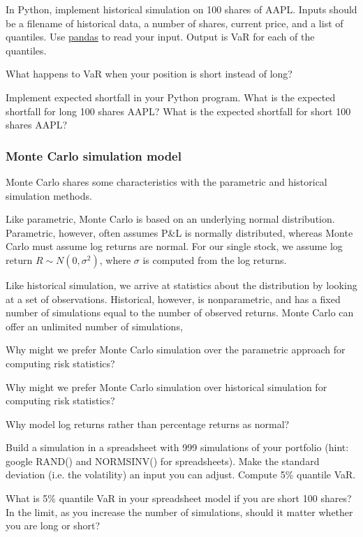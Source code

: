 \documentclass{report}
\numberwithin{problem}{chapter} %
\let\oldroblem\problem
\renewcommand{\problem}{ \oldroblem  \normalfont}
\newcommand{\pnl}{P\&L }
\begin{document}
\problem In Python, implement historical simulation on 100 shares of AAPL. Inputs should be a filename of historical data, a number of shares, current price, and a list of quantiles. Use  \href{https://www.shanelynn.ie/python-pandas-read_csv-load-data-from-csv-files}{pandas} to read your input. Output is VaR for each of the quantiles. 

\problem What happens to VaR when your position is short instead of long?

\problem Implement \gls{expected shortfall} in your Python program. What is the expected shortfall for long 100 shares AAPL? What is the expected shortfall for short 100 shares AAPL? 

\subsubsection{Monte Carlo simulation model}
Monte Carlo shares some characteristics with the parametric and historical simulation methods. 

Like parametric, Monte Carlo is based on an underlying normal distribution. Parametric, however, often assumes \pnl is normally distributed, whereas Monte Carlo must assume log returns are normal. For our single stock, we assume log return $R \sim N(0, \sigma^2)$, where $\sigma$ is computed from the log returns. 

Like historical simulation, we arrive at statistics about the distribution by looking at a set of observations. Historical, however, is nonparametric, and has a fixed number of simulations equal to the number of observed returns. Monte Carlo can offer an unlimited number of simulations,

\problem Why might we prefer Monte Carlo simulation over the parametric approach for computing risk statistics?

\problem Why might we prefer Monte Carlo simulation over historical simulation for computing risk statistics?

\problem Why model log returns rather than percentage returns as normal?

\problem Build a simulation in a spreadsheet with 999 simulations of your portfolio (hint: google RAND() and NORMSINV() for spreadsheets). Make the standard deviation (i.e. the volatility) an input you can adjust.  Compute 5\% quantile VaR. 

\problem What is 5\% quantile VaR in your spreadsheet model if you are \gls{short} 100 shares? In the limit, as you increase the number of simulations, should it matter whether you are long or short? 
\end{document}
